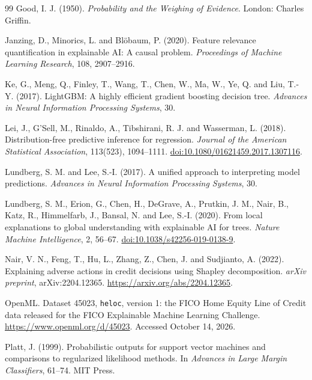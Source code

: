 \begin{thebibliography}{99}
Good, I. J. (1950). \emph{Probability and the Weighing of Evidence}. London: Charles Griffin.

Janzing, D., Minorics, L. and Bl{\"o}baum, P. (2020). Feature relevance quantification in
explainable AI: A causal problem. \emph{Proceedings of Machine Learning Research}, 108, 2907--2916.

Ke, G., Meng, Q., Finley, T., Wang, T., Chen, W., Ma, W., Ye, Q. and Liu, T.-Y. (2017).
LightGBM: A highly efficient gradient boosting decision tree.
\emph{Advances in Neural Information Processing Systems}, 30.

Lei, J., G'Sell, M., Rinaldo, A., Tibshirani, R. J. and Wasserman, L. (2018).
Distribution-free predictive inference for regression.
\emph{Journal of the American Statistical Association}, 113(523), 1094--1111.
\href{https://doi.org/10.1080/01621459.2017.1307116}{doi:10.1080/01621459.2017.1307116}.

Lundberg, S. M. and Lee, S.-I. (2017). A unified approach to interpreting model predictions.
\emph{Advances in Neural Information Processing Systems}, 30.

Lundberg, S. M., Erion, G., Chen, H., DeGrave, A., Prutkin, J. M., Nair, B.,
Katz, R., Himmelfarb, J., Bansal, N. and Lee, S.-I. (2020).
From local explanations to global understanding with explainable AI for trees.
\emph{Nature Machine Intelligence}, 2, 56--67.
\href{https://doi.org/10.1038/s42256-019-0138-9}{doi:10.1038/s42256-019-0138-9}.

Nair, V. N., Feng, T., Hu, L., Zhang, Z., Chen, J. and Sudjianto, A. (2022).
Explaining adverse actions in credit decisions using Shapley decomposition.
\emph{arXiv preprint}, arXiv:2204.12365.
\url{https://arxiv.org/abs/2204.12365}.

OpenML. Dataset 45023, \texttt{heloc}, version 1: the FICO Home Equity Line of Credit data
released for the FICO Explainable Machine Learning Challenge.
\url{https://www.openml.org/d/45023}. Accessed October 14, 2026.

Platt, J. (1999). Probabilistic outputs for support vector machines and comparisons to
regularized likelihood methods. In \emph{Advances in Large Margin Classifiers}, 61--74. MIT Press.


\end{thebibliography}
